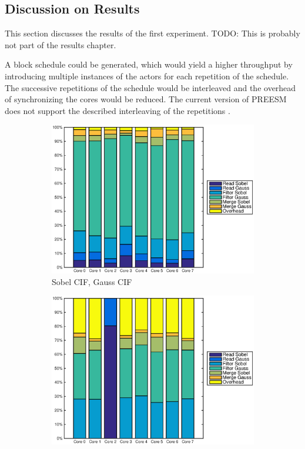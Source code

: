 \subsection{Discussion on Results}
This section discusses the results of the first experiment. TODO: This is
probably not part of the results chapter.

A block schedule could be generated, which would yield a higher throughput by
introducing multiple instances of the actors for each repetition of the
schedule. The successive repetitions of the schedule would be interleaved and
the overhead of synchronizing the cores would be reduced. The current version of
PREESM does not support the described interleaving of the repetitions
\cite{pelcat2014preesm}.

\begin{figure}
    \centering
    \begin{subfigure}[t]{0.49\textwidth}
        \centering
        \includegraphics[width=0.99\linewidth]{images/openem_cifcif_8cores_eo.eps}
        \caption{Sobel CIF, Gauss CIF}
        \label{fig:oem8coreeo}
    \end{subfigure}
    \begin{subfigure}[t]{0.49\textwidth}
        \centering
        \includegraphics[width=0.99\linewidth]{images/openem_sobel4cif_gausscif_eo.eps}

\end{subfigure}
\end{figure}
